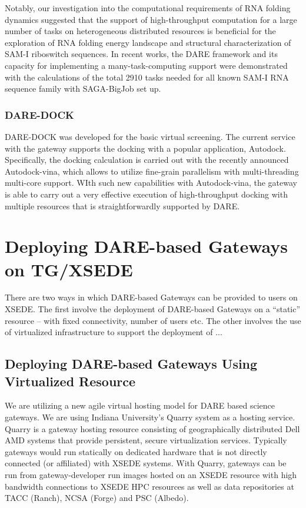 \documentclass[]{svjour3}
\begin{document}
Notably, our investigation into the computational requirements of RNA
folding dynamics suggested that the support of high-throughput
computation for a large number of tasks on heterogeneous distributed
resources is beneficial for the exploration of RNA folding energy
landscape and structural characterization of SAM-I riboswitch
sequences. In recent works\cite{dare-ecmls11,ccpe11}, the DARE
framework and its capacity for implementing a many-task-computing
support were demonstrated with the calculations of the total 2910
tasks needed for all known SAM-I RNA sequence family with SAGA-BigJob set up.


\subsubsection{DARE-DOCK}
DARE-DOCK was developed for the basic virtual screening.  The current service with the gateway supports the docking with a popular application, Autodock\cite{autodock}.   Specifically, the docking calculation is carried out with the recently announced Autodock-vina, which allows to utilize fine-grain parallelism with multi-threading multi-core
support.  WIth such new capabilities with Autodock-vina, the gateway is able to carry out a very effective execution of high-throughput docking with multiple resources that is straightforwardly supported by DARE.  

%

\section{Deploying DARE-based Gateways on TG/XSEDE}

There are two ways in which DARE-based Gateways can be provided to
users on XSEDE. The first involve the deployment of DARE-based
Gateways on a ``static'' resource -- with fixed connectivity, number
of users etc. The other involves the use of virtualized infrastructure
to support the deployment of ...

\subsection{Deploying DARE-based Gateways Using Virtualized Resource}
We are utilizing a new agile virtual hosting model for DARE based
science gateways. We are using Indiana University's Quarry system as a
hosting service. Quarry is a gateway hosting resource consisting of
geographically distributed Dell AMD systems that provide persistent,
secure virtualization services. Typically gateways would run
statically on dedicated hardware that is not directly connected (or
affiliated) with XSEDE systems. With Quarry, gateways can be run from
gateway-developer run images hosted on an XSEDE resource with high
bandwidth connections to XSEDE HPC resources as well as data
repositories at TACC (Ranch), NCSA (Forge) and PSC (Albedo).
\end{document}
